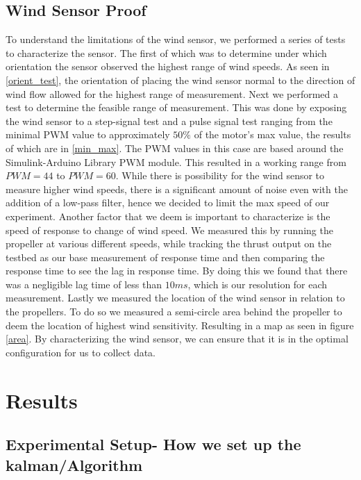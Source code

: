 \documentclass[conference]{IEEEtran}
\begin{document}
	\subsection{Wind Sensor Proof}
	To understand the limitations of the wind sensor, we performed a series of tests to characterize the sensor. The first of which was to determine under which orientation the sensor observed the highest range of wind speeds. As seen in \ref{orient_test}, the orientation of placing the wind sensor normal to the direction of wind flow allowed for the highest range of measurement. Next we performed a test to determine the feasible range of measurement. This was done by exposing the wind sensor to a step-signal test and a pulse signal test ranging from the minimal PWM value to approximately $50\%$ of the motor's max value, the results of which are in \ref{min_max}. The PWM values in this case are based around the Simulink-Arduino Library PWM module.  This resulted in a working range from $PWM = 44$ to $PWM = 60$. While there is possibility for the wind sensor to measure higher wind speeds, there is a significant amount of noise even with the addition of a low-pass filter, hence we decided to limit the max speed of our experiment. 
	Another factor that we deem is important to characterize is the speed of response to change of wind speed. We measured this by running the propeller at various different speeds, while tracking the thrust output on the testbed as our base measurement of response time and then comparing the response time to see the lag in response time. By doing this we found that there was a negligible lag time of less than $10 ms$, which is our resolution for each measurement.
	Lastly we measured the location of the wind sensor in relation to the propellers. To do so we measured a semi-circle area behind the propeller to deem the location of highest wind sensitivity. Resulting in a map as seen in figure \ref{area}. 
	By characterizing the wind sensor, we can ensure that it is in the optimal configuration for us to collect data.
	\section{Results}
	\subsection{Experimental Setup- How we set up the kalman/Algorithm}
\end{document}
